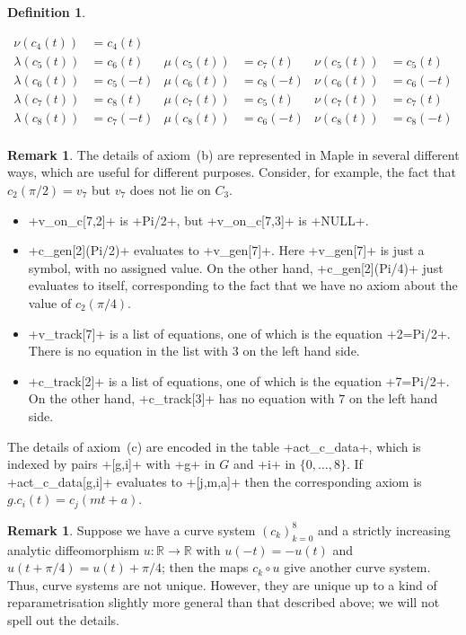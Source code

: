 \documentclass[reqno]{amsart}
\newcommand{\lm}        {\lambda}
\newcommand{\R}         {{\mathbb{R}}}
\renewcommand{\:}{\colon}
\theoremstyle{definition}
\newtheorem{remark}[theorem]{Remark}
\newtheorem{definition}[theorem]{Definition}
\begin{document}
\begin{definition}
\begin{itemize}
\begin{align*}
    \nu(c_{ 4}(t)) &= c_{ 4}( t) \\
    \lm(c_{ 5}(t)) &= c_{ 6}( t)       &
    \mu(c_{ 5}(t)) &= c_{ 7}( t)       &
    \nu(c_{ 5}(t)) &= c_{ 5}( t) \\
    \lm(c_{ 6}(t)) &= c_{ 5}(-t)       &
    \mu(c_{ 6}(t)) &= c_{ 8}(-t)       &
    \nu(c_{ 6}(t)) &= c_{ 6}(-t) \\
    \lm(c_{ 7}(t)) &= c_{ 8}( t)       &
    \mu(c_{ 7}(t)) &= c_{ 5}( t)       &
    \nu(c_{ 7}(t)) &= c_{ 7}( t) \\
    \lm(c_{ 8}(t)) &= c_{ 7}(-t)       &
    \mu(c_{ 8}(t)) &= c_{ 6}(-t)       &
    \nu(c_{ 8}(t)) &= c_{ 8}(-t) \\
   \end{align*}
 \end{itemize}
\end{definition}

\begin{remark}
 The details of axiom~(b) are represented in Maple in several
 different ways, which are useful for different purposes.  Consider,
 for example, the fact that $c_2(\pi/2)=v_7$ but $v_7$ does not lie on
 $C_3$.
 \begin{itemize}
  \item \mcode+v_on_c[7,2]+ is \mcode+Pi/2+, but \mcode+v_on_c[7,3]+ is
   \mcode+NULL+.
  \item \mcode+c_gen[2](Pi/2)+ evaluates to \mcode+v_gen[7]+.  Here
   \mcode+v_gen[7]+ is just a symbol, with no assigned value.  On the
   other hand, \mcode+c_gen[2](Pi/4)+ just evaluates to itself,
   corresponding to the fact that we have no axiom about the value of
   $c_2(\pi/4)$.
  \item \mcode+v_track[7]+ is a list of equations, one of which
   is the equation \mcode+2=Pi/2+.  There is no equation in the list
   with $3$ on the left hand side.
  \item \mcode+c_track[2]+ is a list of equations, one of which is the
   equation \mcode+7=Pi/2+.  On the other hand, \mcode+c_track[3]+ has no
   equation with $7$ on the left hand side.
 \end{itemize}
 The details of axiom~(c) are encoded in the table \mcode+act_c_data+,
 which is indexed by pairs \mcode+[g,i]+ with \mcode+g+ in $G$ and
 \mcode+i+ in $\{0,\dotsc,8\}$.  If \mcode+act_c_data[g,i]+ evaluates to
 \mcode+[j,m,a]+ then the corresponding axiom is $g.c_i(t)=c_j(mt+a)$.
\end{remark}

\begin{remark}
 Suppose we have a curve system $(c_k)_{k=0}^8$ and a strictly
 increasing analytic diffeomorphism $u\:\R\to\R$ with $u(-t)=-u(t)$
 and $u(t+\pi/4)=u(t)+\pi/4$; then the maps $c_k\circ u$ give another
 curve system.  Thus, curve systems are not unique.  However, they are
 unique up to a kind of reparametrisation slightly more general than
 that described above; we will not spell out the details.
\end{remark}
\end{document}
